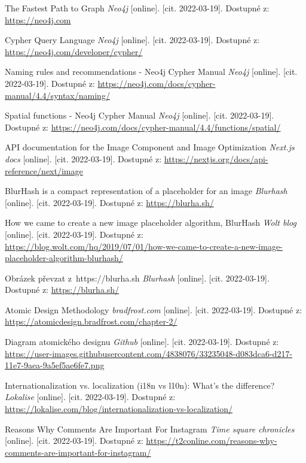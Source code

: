 \begin{thebibliography}{100}
 The Fastest Path to Graph \textit{Neo4j} [online]. [cit. 2022-03-19]. Dostupné z: \url{https://neo4j.com}

 Cypher Query Language \textit{Neo4j} [online]. [cit. 2022-03-19]. Dostupné z: \url{https://neo4j.com/developer/cypher/}

 Naming rules and recommendations - Neo4j Cypher Manual \textit{Neo4j} [online]. [cit. 2022-03-19]. Dostupné z: \url{https://neo4j.com/docs/cypher-manual/4.4/syntax/naming/}

 Spatial functions - Neo4j Cypher Manual \textit{Neo4j} [online]. [cit. 2022-03-19]. Dostupné z: \url{https://neo4j.com/docs/cypher-manual/4.4/functions/spatial/}

 API documentation for the Image Component and Image Optimization \textit{Next.js docs} [online]. [cit. 2022-03-19]. Dostupné z: \url{https://nextjs.org/docs/api-reference/next/image}

 BlurHash is a compact representation of a placeholder for an image \textit{Blurhash} [online]. [cit. 2022-03-19]. Dostupné z: \url{https://blurha.sh/}

 How we came to create a new image placeholder algorithm, BlurHash \textit{Wolt blog} [online]. [cit. 2022-03-19]. Dostupné z: \url{https://blog.wolt.com/hq/2019/07/01/how-we-came-to-create-a-new-image-placeholder-algorithm-blurhash/}

 Obrázek převzat z~https://blurha.sh \textit{Blurhash} [online]. [cit. 2022-03-19]. Dostupné z: \url{https://blurha.sh/}

 Atomic Design Methodology \textit{bradfrost.com} [online]. [cit. 2022-03-19]. Dostupné z: \url{https://atomicdesign.bradfrost.com/chapter-2/}

 Diagram atomického designu \textit{Github} [online]. [cit. 2022-03-19]. Dostupné z: \url{https://user-images.githubusercontent.com/4838076/33235048-d083dca6-d217-11e7-9aea-9a5ef5ae6fe7.png}

 Internationalization vs. localization (i18n vs l10n): What’s the difference? \textit{Lokalise} [online]. [cit. 2022-03-19]. Dostupné z: \url{https://lokalise.com/blog/internationalization-vs-localization/}

 Reasons Why Comments Are Important For Instagram \textit{Time square chronicles} [online]. [cit. 2022-03-19]. Dostupné z: \url{https://t2conline.com/reasons-why-comments-are-important-for-instagram/}


\end{thebibliography}

\newpage{\pagestyle{empty}\cleardoublepage}